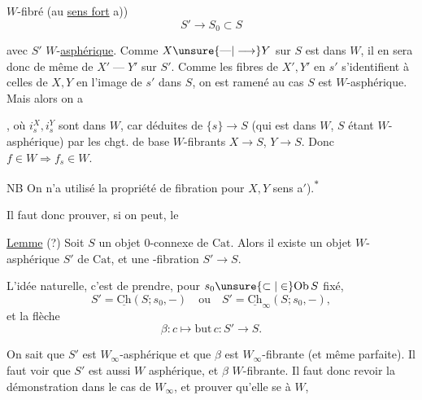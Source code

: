
$W$-fibré (au \uline{sens fort} a))
\[
S'\longrightarrow S_0\subset S
\]

avec $S'$ $W$-\uline{asphérique}. Comme $X\unsure{\text{---}|\longrightarrow}Y$ sur $S$ est dans $W$, il en sera donc de même de $X'\mathrel{\text{---}}Y'$ sur $S'$.  Comme les fibres de $X',Y'$ en $s'$ s'identifient à celles de $X,Y$ en l'image de $s'$ dans $S$, on est ramené au cas  $S$  est $W$-asphérique. Mais alors on a


, où $i_s^X,i_s^Y$ sont dans $W$, car déduites de $\{s\}\longrightarrow S$ (qui est dans $W$, $S$ étant $W$-asphérique) par les chgt. de base $W$-fibrants $X\longrightarrow S$, $Y\longrightarrow S$. Donc $f\in W\Longrightarrow f_s\in W$.

NB On n'a utilisé la propriété de fibration pour $X,Y$  sens a$'$).\textsuperscript{$*$}


Il faut donc  prouver, si on peut, le

\uline{Lemme} (?) Soit $S$ un objet $0$-connexe de $\mathrm{Cat}$. Alors il existe un objet $W$-asphérique $S'$ de $\mathrm{Cat}$, et une -fibration  $S'\longrightarrow S$.


L'idée naturelle, c'est de prendre, pour $s_0\unsure{\subset|\in}\mathrm{Ob}\,S$ fixé,
\[
S'=\underline{\mathrm{Ch}}(S;s_0,-)\quad\text{ou}\quad S'=\underline{\mathrm{Ch}}_\infty(S;s_0,-),
\]
et la flèche
\[
\beta:c\longmapsto\mathrm{but}\,c:S'\longrightarrow S.
\]

On sait que $S'$ est $W_\infty$-asphérique et que $\beta$ est $W_\infty$-fibrante (et même parfaite). Il faut voir que $S'$ est aussi $W$ asphérique, et $\beta$ $W$-fibrante. Il faut donc revoir la démonstration dans le cas de $W_\infty$, et prouver qu'elle se  à $W$,

